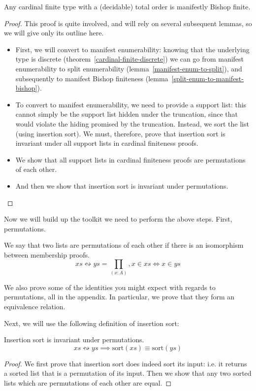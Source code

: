 \begin{refsection}
\begin{theorem}
  Any cardinal finite type with a (decidable) total order is manifestly Bishop
  finite.
\end{theorem}
\begin{proof}
  This proof is quite involved, and will rely on several subsequent lemmas, so
  we will give only its outline here.
  \begin{itemize}
    \item First, we will convert to manifest enumerability: knowing that the
      underlying type is discrete (theorem~\ref{cardinal-finite-discrete}) we can
      go from manifest enumerability to split enumerability
      (lemma~\ref{manifest-enum-to-split}), and subsequently to manifest Bishop
      finiteness (lemma~\ref{split-enum-to-manifest-bishop}).
    \item To convert to manifest enumerability, we need to provide a support
      list: this cannot simply be the support list hidden under the truncation,
      since that would violate the hiding promised by the truncation.
      Instead, we sort the list (using insertion sort).
      We must, therefore, prove that insertion sort is invariant under all
      support lists in cardinal finiteness proofs.
    \item We show that all support lists in cardinal finiteness proofs are
      permutations of each other.
    \item And then we show that insertion sort is invariant under permutations.
  \end{itemize} 
\end{proof}
Now we will build up the toolkit we need to perform the above steps.
First, permutations.
\begin{definition}
  We say that two lists are permutations of each other if there is an
  isomorphism between membership proofs.
  \begin{equation}
    \mathit{xs} \leftrightsquigarrow \mathit{ys} = \prod_{(x : A)} , x \in \mathit{xs} \iff x \in \mathit{ys}
  \end{equation}
\end{definition}
We also prove some of the identities you might expect with regards to
permutations, all in the appendix.
In particular, we prove that they form an equivalence relation.

Next, we will use the following definition of insertion sort:
\begin{lemma}
  Insertion sort is invariant under permutations.
  \begin{equation}
    \mathit{xs} \leftrightsquigarrow \mathit{ys} \implies \text{sort}(\mathit{xs}) \equiv \text{sort}(\mathit{ys})
  \end{equation}
\end{lemma}
\begin{proof}
  We first prove that insertion sort does indeed sort its input: i.e. it returns
  a sorted list that is a permutation of its input.
  Then we show that any two sorted lists which are permutations of each other
  are equal.
\end{proof}

\end{refsection}
